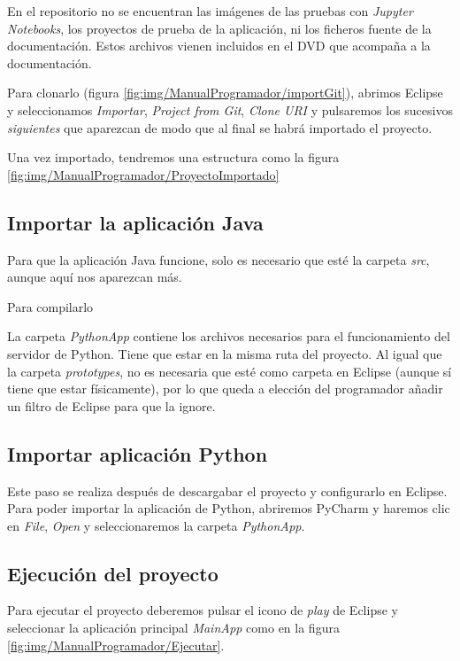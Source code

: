 En el repositorio no se encuentran las imágenes de las pruebas con \textit{Jupyter Notebooks}, los proyectos de prueba de la aplicación, ni los ficheros fuente de la documentación. Estos archivos vienen incluidos en el DVD que acompaña a la documentación.

Para clonarlo (figura \ref{fig:img/ManualProgramador/importGit}), abrimos Eclipse y seleccionamos \textit{Importar}, \textit{Project from Git}, \textit{Clone URI} y pulsaremos los sucesivos \textit{siguientes} que aparezcan de modo que al final se habrá importado el proyecto. 


Una vez importado, tendremos una estructura como la figura \ref{fig:img/ManualProgramador/ProyectoImportado}


\newpage
\subsection{Importar la aplicación Java}

Para que la aplicación Java funcione, solo es necesario que esté la carpeta \textit{src}, aunque aquí nos aparezcan más.

Para compilarlo

La carpeta \textit{PythonApp} contiene los archivos necesarios para el funcionamiento del servidor de Python. Tiene que estar en la misma ruta del proyecto. Al igual que la carpeta \textit{prototypes}, no es necesaria que esté como carpeta en Eclipse (aunque sí tiene que estar físicamente), por lo que queda a elección del programador añadir un filtro de Eclipse para que la ignore.



\subsection{Importar aplicación Python}
Este paso se realiza después de descargabar el proyecto y configurarlo en Eclipse. Para poder importar la aplicación de Python, abriremos PyCharm y haremos clic en \textit{File}, \textit{Open} y seleccionaremos la carpeta \textit{PythonApp}.

\subsection{Ejecución del proyecto}
Para ejecutar el proyecto deberemos pulsar el icono de \textit{play} de Eclipse y seleccionar la aplicación principal \textit{MainApp} como en la figura \ref{fig:img/ManualProgramador/Ejecutar}.

